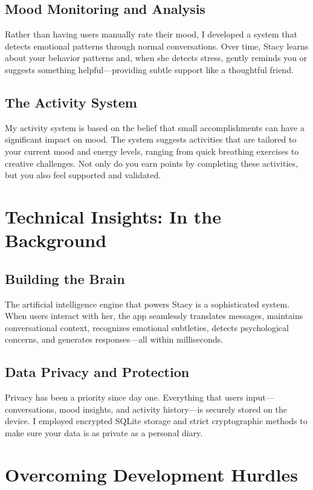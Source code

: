 \documentclass[12pt]{article}
\begin{document}
\subsection{Mood Monitoring and Analysis}
Rather than having users manually rate their mood, I developed a system that detects emotional patterns through normal conversations. Over time, Stacy learns about your behavior patterns and, when she detects stress, gently reminds you or suggests something helpful—providing subtle support like a thoughtful friend.

\subsection{The Activity System}
My activity system is based on the belief that small accomplishments can have a significant impact on mood. The system suggests activities that are tailored to your current mood and energy levels, ranging from quick breathing exercises to creative challenges. Not only do you earn points by completing these activities, but you also feel supported and validated.

\section{Technical Insights: In the Background}

\subsection{Building the Brain}
The artificial intelligence engine that powers Stacy is a sophisticated system. When users interact with her, the app seamlessly translates messages, maintains conversational context, recognizes emotional subtleties, detects psychological concerns, and generates responses—all within milliseconds.

\subsection{Data Privacy and Protection}
Privacy has been a priority since day one. Everything that users input—conversations, mood insights, and activity history—is securely stored on the device. I employed encrypted SQLite storage and strict cryptographic methods to make sure your data is as private as a personal diary.

\section{Overcoming Development Hurdles}
\end{document}
